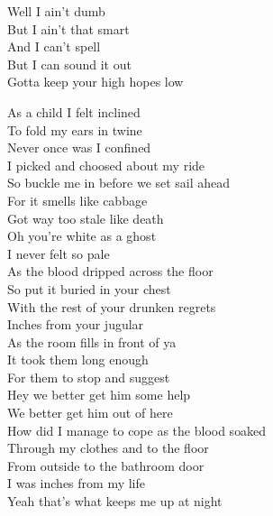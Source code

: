 


Well I ain't dumb\\
But I ain't that smart\\
And I can't spell\\
But I can sound it out\\

Gotta keep your high hopes low\\




As a child I felt inclined\\
To fold my ears in twine\\
Never once was I confined\\
I picked and choosed about my ride\\
So buckle me in before we set sail ahead\\
For it smells like cabbage\\
Got way too stale like death\\

Oh you're white as a ghost\\
I never felt so pale\\
As the blood dripped across the floor\\

So put it buried in your chest\\
With the rest of your drunken regrets\\
Inches from your jugular\\
As the room fills in front of ya\\
It took them long enough\\
For them to stop and suggest\\
Hey we better get him some help\\
We better get him out of here\\

How did I manage to cope as the blood soaked\\
Through my clothes and to the floor\\
From outside to the bathroom door\\
I was inches from my life\\
Yeah that's what keeps me up at night\\

